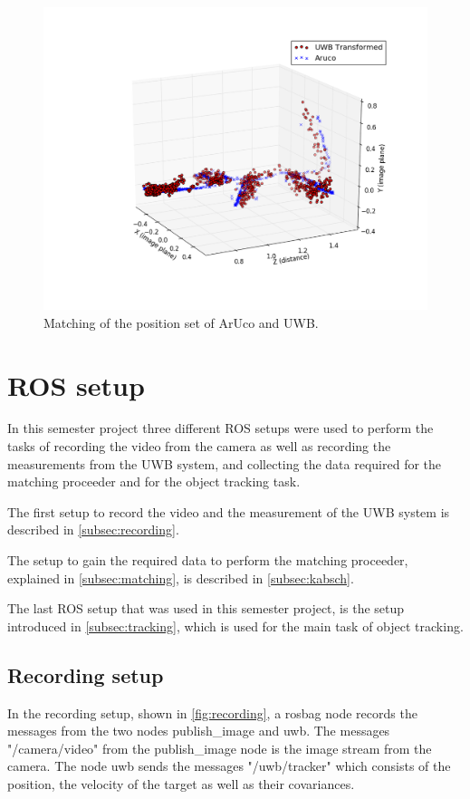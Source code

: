 \begin{figure}[ht!]\centering
	\includegraphics[width=1.0\textwidth]{figures/matching}
	\caption{Matching of the position set of ArUco and \ac{UWB}.}\label{fig:matching}
\end{figure} 

\section{\ac{ROS} setup}
In this semester project three different \ac{ROS} setups were used to perform the tasks of recording the video from the camera as well as recording the measurements from the \ac{UWB} system, and collecting the data required for the matching proceeder and for the object tracking task.

The first setup to record the video and the measurement of the \ac{UWB} system is described in \autoref{subsec:recording}.

The setup to gain the required data to perform the matching proceeder, explained in \autoref{subsec:matching}, is described in \autoref{subsec:kabsch}.

The last \ac{ROS} setup that was used in this semester project, is the setup introduced in \autoref{subsec:tracking}, which is used for the main task of object tracking.

\subsection{Recording setup}\label{subsec:recording}
In the recording setup, shown in \autoref{fig:recording}, a rosbag node records the messages from the two nodes publish\_image and uwb. The messages "/camera/video" from the publish\_image node is the image stream from the camera. The node uwb sends the messages "/uwb/tracker" which consists of the position, the velocity of the target as well as their covariances.

